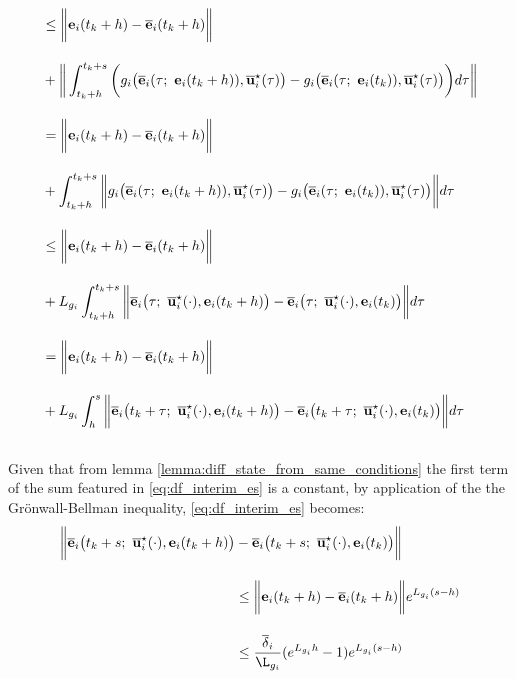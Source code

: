 \begin{gg_box}
\begin{align}
    &\leq \bigg\| \vect{e}_i(t_k +h) - \overline{\vect{e}}_i(t_k + h) \bigg \| \\[2.5ex]
    &+ \bigg\| \int_{t_k +h}^{t_k + s} \bigg( g_i\big(\overline{\vect{e}}_i(\tau;\ \vect{e}_i(t_k + h)), \overline{\vect{u}}_i^{\star}(\tau)\big)
    -  g_i\big(\overline{\vect{e}}_i(\tau;\ \vect{e}_i(t_k)), \overline{\vect{u}}_i^{\star}(\tau)\big) \bigg) d\tau \bigg\| \\[2.5ex]
    &= \bigg\| \vect{e}_i(t_k +h) - \overline{\vect{e}}_i(t_k + h) \bigg \| \\[2.5ex]
    &+ \int_{t_k +h}^{t_k + s} \bigg\| g_i\big(\overline{\vect{e}}_i(\tau;\ \vect{e}_i(t_k + h)), \overline{\vect{u}}_i^{\star}(\tau)\big)
    -  g_i\big(\overline{\vect{e}}_i(\tau;\ \vect{e}_i(t_k)), \overline{\vect{u}}_i^{\star}(\tau)\big) \bigg\| d\tau \\[2.5ex]
    &\leq \bigg\| \vect{e}_i(t_k +h) - \overline{\vect{e}}_i(t_k + h) \bigg \| \\[2.5ex]
    &+ L_{g_i} \int_{t_k +h}^{t_k + s} \bigg\| \overline{\vect{e}}_i\big(\tau;\ \overline{\vect{u}}_i^{\star}(\cdot), \vect{e}_i(t_k + h) \big)
    -  \overline{\vect{e}}_i\big(\tau;\ \overline{\vect{u}}_i^{\star}(\cdot), \vect{e}_i(t_k)\big) \bigg\| d\tau \\[2.5ex]
    &= \bigg\| \vect{e}_i(t_k +h) - \overline{\vect{e}}_i(t_k + h) \bigg \| \\[2.5ex]
    &+ L_{g_i} \int_{h}^{s} \bigg\| \overline{\vect{e}}_i\big(t_k + \tau;\ \overline{\vect{u}}_i^{\star}(\cdot), \vect{e}_i(t_k + h) \big)
    -  \overline{\vect{e}}_i\big(t_k + \tau;\ \overline{\vect{u}}_i^{\star}(\cdot), \vect{e}_i(t_k)\big) \bigg\| d\tau \\[2.5ex]
    \label{eq:df_interim_es}
\end{align}

Given that from lemma \eqref{lemma:diff_state_from_same_conditions}
the first term of the sum featured in \eqref{eq:df_interim_es} is a constant,
by application of the the Gr\"{o}nwall-Bellman inequality,
\eqref{eq:df_interim_es} becomes:
\begin{align}
  \bigg \| \overline{\vect{e}}_i\big(t_k + s;\ \overline{\vect{u}}_i^{\star}(\cdot), \vect{e}_i(t_k +h)\big)
    &-\overline{\vect{e}}_i\big(t_k + s;\ \overline{\vect{u}}_i^{\star}(\cdot), \vect{e}_i(t_k)\big) \bigg \| \\[2.5ex]
    &\leq \bigg\| \vect{e}_i(t_k +h) - \overline{\vect{e}}_i(t_k + h) \bigg \| e^{L_{g_i}(s-h)} \\[2.5ex]
    &\leq \dfrac{\overline{\delta}_i}{\L_{g_i}} (e^{L_{g_i}h} - 1) e^{L_{g_i}(s-h)}
\end{align}
\end{gg_box}

